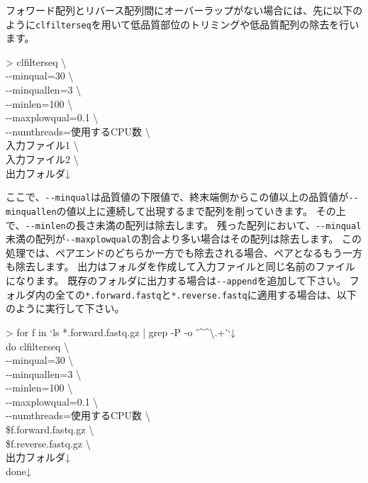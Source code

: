 \documentclass[titlepage,10pt,a4paper]{jsbook}
\newenvironment{cmd}{\begin{oframed}\raggedright\ttfamily\footnotesize\setlength{\baselineskip}{1.4em}}{\end{oframed}\vspace{-1em}}
\begin{document}
フォワード配列とリバース配列間にオーバーラップがない場合には、先に以下のように\texttt{clfilterseq}を用いて低品質部位のトリミングや低品質配列の除去を行います。

\begin{cmd}
{\textgreater} clfilterseq {\textbackslash}\\
{-}{-}minqual=30 {\textbackslash}\\
{-}{-}minquallen=3 {\textbackslash}\\
{-}{-}minlen=100 {\textbackslash}\\
{-}{-}maxplowqual=0.1 {\textbackslash}\\
{-}{-}numthreads=使用するCPU数 {\textbackslash}\\
入力ファイル1 {\textbackslash}\\
入力ファイル2 {\textbackslash}\\
出力フォルダ↓
\end{cmd}

ここで、\texttt{{-}{-}minqual}は品質値の下限値で、終末端側からこの値以上の品質値が\texttt{{-}{-}minquallen}の値以上に連続して出現するまで配列を削っていきます。
その上で、\texttt{{-}{-}minlen}の長さ未満の配列は除去します。
残った配列において、\texttt{{-}{-}minqual}未満の配列が\texttt{{-}{-}maxplowqual}の割合より多い場合はその配列は除去します。
この処理では、ペアエンドのどちらか一方でも除去される場合、ペアとなるもう一方も除去します。
出力はフォルダを作成して入力ファイルと同じ名前のファイルになります。
既存のフォルダに出力する場合は\texttt{{-}{-}append}を追加して下さい。
フォルダ内の全ての\texttt{*.forward.fastq}と\texttt{*.reverse.fastq}に適用する場合は、以下のように実行して下さい。

\begin{cmd}
{\textgreater} for f in `ls *.forward.fastq.gz | grep -P -o '{\textasciicircum}{\lbrack}{\textasciicircum}{\textbackslash}.{\rbrack}+'`↓\\
do clfilterseq {\textbackslash}\\
{-}{-}minqual=30 {\textbackslash}\\
{-}{-}minquallen=3 {\textbackslash}\\
{-}{-}minlen=100 {\textbackslash}\\
{-}{-}maxplowqual=0.1 {\textbackslash}\\
{-}{-}numthreads=使用するCPU数 {\textbackslash}\\
\$f.forward.fastq.gz {\textbackslash}\\
\$f.reverse.fastq.gz {\textbackslash}\\
出力フォルダ↓\\
done↓
\end{cmd}
\end{document}
